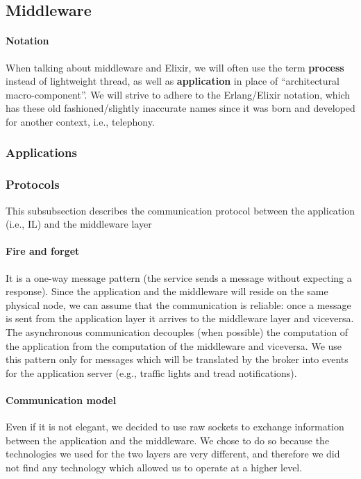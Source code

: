 \subsection{Middleware}


\paragraph{Notation}
When talking about middleware and Elixir, we will often use the term
\textbf{process} instead of lightweight thread, as well as \textbf{application}
in place of ``architectural macro-component''.
We will strive to adhere
to the Erlang/Elixir notation, which has these old fashioned/slightly inaccurate
names since it was born and developed for another context, i.e., telephony.


\subsubsection{Applications}



\subsubsection{Protocols}

This subsubsection describes the communication protocol between
the application (i.e., IL) and the middleware layer
\paragraph{Fire and forget}
It is a one-way message pattern (the service sends a message without expecting
a response). Since the application and the middleware will reside on the same
physical node, we can assume that the communication is reliable: once a message
is sent from the application layer it arrives to the middleware layer and
viceversa. The asynchronous communication decouples (when possible)
the computation of the application from the computation of the middleware
and viceversa. We use this pattern only for messages which will be
translated by the broker into events for the application server
(e.g., traffic lights and tread
notifications).

\paragraph{Communication model}
Even if it is not elegant, we decided to use raw sockets to exchange
information between the application and the middleware.
We chose to do so because the technologies we used for the two layers are very
different, and therefore we did not find any technology which allowed us to
operate at a higher level.

